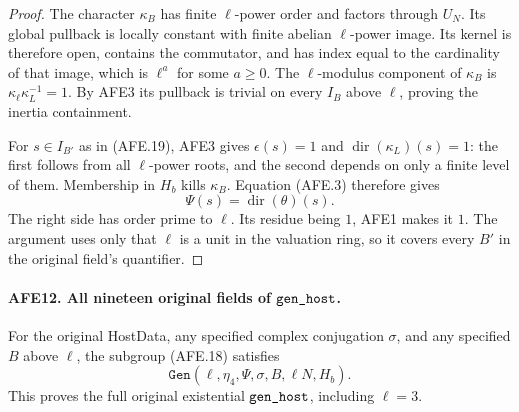 \documentclass[11pt,a4paper]{article}
\numberwithin{equation}{section}
\theoremstyle{remark}\newtheorem{remark}[theorem]{Remark}
\begin{document}
\begin{proof}
The character \(\kappa_B\) has finite \(\ell\)-power
order and factors through \(U_N\).
Its global pullback is locally constant with finite
abelian \(\ell\)-power image.
Its kernel is therefore open, contains the commutator,
and has index equal to the cardinality of that image,
which is \(\ell^a\) for some \(a\ge0\).
The \(\ell\)-modulus component of \(\kappa_B\) is
\(\kappa_\ell\kappa_L^{-1}=1\).
By AFE3 its pullback is trivial on every \(I_B\)
above \(\ell\), proving the inertia containment.

For \(s\in I_{B'}\) as in (AFE.19), AFE3 gives
\(\epsilon(s)=1\) and
\(\operatorname{dir}(\kappa_L)(s)=1\):
the first follows from all \(\ell\)-power roots,
and the second depends on only a finite level of them.
Membership in \(H_b\) kills \(\kappa_B\).
Equation (AFE.3) therefore gives
\[
                         \Psi(s)=\operatorname{dir}(\theta)(s).
 \]
The right side has order prime to \(\ell\).
Its residue being \(1\), AFE1 makes it \(1\).
The argument uses only that \(\ell\) is a unit in
the valuation ring, so it covers every \(B'\) in
the original field's quantifier.
\end{proof}

\paragraph{AFE12. All nineteen original fields of \(\texttt{gen\_\allowbreak host}\).}
\label{claim:AFE12}
For the original HostData, any specified complex
conjugation \(\sigma\), and any specified \(B\) above
\(\ell\), the subgroup (AFE.18) satisfies
\[
        \texttt{Gen}(\ell,\eta_4,\Psi,\sigma,B,\ell N,H_b).
                                                        \tag{AFE.20}
\]
This proves the full original existential
\(\texttt{gen\_\allowbreak host}\), including \(\ell=3\).
\end{document}
